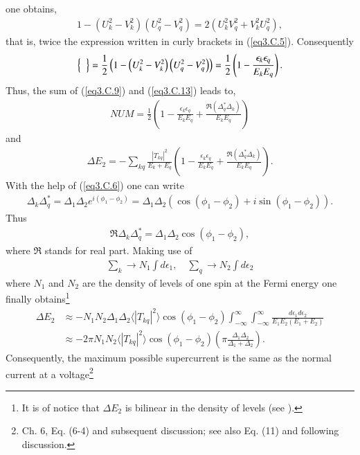 one obtains,
\begin{align}
1-\left(U_k^2-V_k^2\right)\left(U_q^2-V_q^2\right)=2\left(U_k^2V_q^2+V_k^2U_q^2\right),
\end{align}
that is, twice the expression written in curly brackets in (\ref{eq3.C.5}). Consequently
\begin{align}\label{eq3.C.13}
\left\{\vphantom{\left(U_q^2-V_q^2\right)}\;\;\right\}=\frac{1}{2}\left(1-\left(U_k^2-V_k^2\right)\left(U_q^2-V_q^2\right)\right)=\frac{1}{2}\left(1-\frac{\epsilon_k\epsilon_q}{E_kE_q}\right).
\end{align}
Thus, the sum of (\ref{eq3.C.9}) and (\ref{eq3.C.13}) leads to,
\begin{align}
NUM=\frac{1}{2}\left(1-\frac{\epsilon_k\epsilon_q}{E_kE_q}+\frac{\Re(\Delta_q^*\Delta_k)}{E_kE_q}\right)
\end{align}
and
\begin{align}
\Delta E_2=-\sum_{kq}\frac{|T_{kq}|^2}{E_k+E_q}\left(1-\frac{\epsilon_k\epsilon_q}{E_kE_q}+\frac{\Re(\Delta_q^*\Delta_k)}{E_kE_q}\right).
\end{align}
With the help of (\ref{eq3.C.6}) one can write
\begin{align}
\Delta_k\Delta_q^*=\Delta_1\Delta_2e^{i(\phi_1-\phi_2)}=\Delta_1\Delta_2\left(\cos(\phi_1-\phi_2)+i\sin(\phi_1-\phi_2)\right).
\end{align}
Thus
\begin{align}
\Re\Delta_k\Delta_q^*=\Delta_1\Delta_2\cos(\phi_1-\phi_2),
\end{align}
where $\Re$ stands for real part. Making use of
\begin{align}
\sum_k\rightarrow N_1\int d\epsilon_1,\quad\sum_q\rightarrow N_2\int d\epsilon_2
\end{align}
where $N_1$ and $N_2$ are the density of levels of one spin at the Fermi energy one finally obtains\footnote{It is of notice that $\Delta E_2$ is bilinear in the density of levels (see \cite{Potel:17}).}
\begin{align}\label{eq3.6.19}
\nonumber\Delta E_2&\approx-N_1N_2\Delta_1 \Delta_2 \langle|T_{kq}|^2\rangle \cos(\phi_1-\phi_2)\int_{-\infty}^{\infty}\int_{-\infty}^{\infty}\frac{d\epsilon_1 d\epsilon_2}{E_1 E_2(E_1+E_2)}\\
&\approx -2\pi N_1 N_2 \langle|T_{kq}|^2\rangle \cos(\phi_1-\phi_2) \left(\pi\frac{\Delta_1\Delta_2}{\Delta_1+\Delta_2}\right).
\end{align}
Consequently, the maximum possible supercurrent is the same as the normal current at a  voltage\footnote{\cite{Tinkham:96} Ch. 6, Eq. (6-4) and subsequent discussion; see also \cite{Anderson:64} Eq. (11) and following discussion.}
